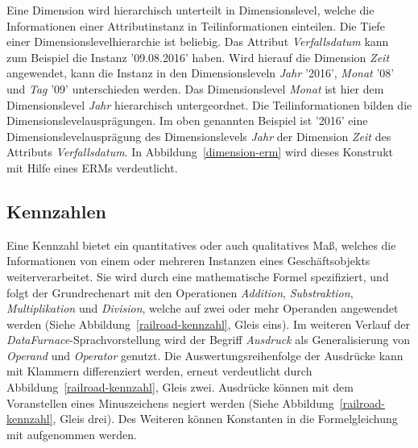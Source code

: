 \documentclass[
  language=german, %
  type=bachelor%
]{isthesis}
\begin{document}
\begin{content}
  \begin{figure}[caption={\acrshort{ERM} der Dimensionteilsprache}, label={dimension-erm}]
    \resizebox{350px}{!}{}
  \end{figure}

	Eine Dimension wird hierarchisch unterteilt in Dimensionslevel, welche die
	Informationen einer Attributinstanz in Teilinformationen einteilen. Die Tiefe
	einer Dimensionslevelhierarchie ist beliebig. Das Attribut
	\textit{Verfallsdatum} kann zum Beispiel die Instanz '09.08.2016' haben. Wird
	hierauf die Dimension \textit{Zeit} angewendet, kann die Instanz in den
	Dimensionsleveln \textit{Jahr} '2016', \textit{Monat} '08' und \textit{Tag}
	'09' unterschieden werden. Das Dimensionslevel \textit{Monat} ist hier dem
	Dimensionslevel \textit{Jahr} hierarchisch untergeordnet. Die
	Teilinformationen bilden die Dimensionslevelausprägungen. Im oben genannten
	Beispiel ist '2016' eine Dimensionslevelausprägung des Dimensionslevels
	\textit{Jahr} der Dimension \textit{Zeit} des Attributs
	\textit{Verfallsdatum}. In Abbildung~\ref{dimension-erm} wird dieses
	Konstrukt mit Hilfe eines \acrshort{ERM}s verdeutlicht.

  \subsection{Kennzahlen}

  \begin{figure}[caption={\acrshort{ERM} der Kennzahlteilsprache}, label={kennzahl}]
    \resizebox{250px}{!}{}
  \end{figure}

	Eine Kennzahl bietet ein quantitatives oder auch qualitatives Maß, welches
	die Informationen von einem oder mehreren Instanzen eines Geschäftsobjekts
	weiterverarbeitet. Sie wird durch eine mathematische Formel spezifiziert, und
	folgt der Grundrechenart mit den Operationen \textit{Addition},
	\textit{Substraktion}, \textit{Multiplikation} und \textit{Division}, welche
	auf zwei oder mehr Operanden angewendet werden (Siehe
	Abbildung~\ref{railroad-kennzahl}, Gleis eins). Im weiteren Verlauf der
	\textit{DataFurnace}-Sprachvorstellung wird der Begriff \textit{Ausdruck} als
	Generalisierung von \textit{Operand} und \textit{Operator} genutzt.  Die
	Auswertungsreihenfolge der Ausdrücke kann mit Klammern differenziert werden,
	erneut verdeutlicht durch Abbildung~\ref{railroad-kennzahl}, Gleis zwei.
	Ausdrücke können mit dem Voranstellen eines Minuszeichens negiert werden
	(Siehe Abbildung~\ref{railroad-kennzahl}, Gleis drei). Des Weiteren können
	Konstanten in die Formelgleichung mit aufgenommen werden.


\end{content}
\end{document}
